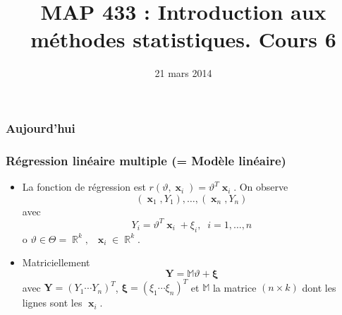 \documentclass{beamer}
\title{MAP 433 : Introduction aux méthodes statistiques. Cours 6}
\DeclareMathOperator{\R}{{\mathbb R}}
\DeclareMathOperator{\bx}{\boldsymbol{x}}
\begin{document}
\date{21 mars 2014}
\maketitle



\begin{frame}
\frametitle{Aujourd'hui}
\tableofcontents
\end{frame}





\begin{frame}
\frametitle{Régression linéaire multiple (= Modèle linéaire)}
\begin{itemize}
\item La fonction de régression est $r(\vartheta,\bx_i) = \vartheta^T\bx_i$.
On observe
$$(\bx_1,Y_1),\ldots, (\bx_n,Y_n)$$
avec
$$\boxed{Y_i = \vartheta^T\bx_i+\xi_i,\;\;i=1,\ldots, n}$$
o $\vartheta \in \Theta = \R^k,\;\;\bx_i \in \R^k$.
\item \alert{Matriciellement}
$$\boxed{\boldsymbol{Y} = \mathbb{M}\vartheta + \boldsymbol{\xi}}$$
avec $\boldsymbol{Y} = (Y_1 \cdots Y_n)^T$, $\boldsymbol{\xi} =
(\xi_1 \cdots \xi_n)^T$ et $\mathbb{M}$ la matrice $(n\times k)$
dont les \alert{ lignes} sont les $\bx_i$.
\end{itemize}
\end{frame}
\end{document}
